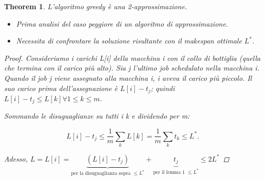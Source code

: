 \documentclass{article}
\newtheorem{theorem}{Theorem}[subsection]
\begin{document}
\begin{theorem}
    L'algoritmo greedy è una 2-approssimazione.
    \begin{itemize}
        \item Prima analisi del caso peggiore di un algoritmo di approssimazione.
        \item Necessita di confrontare la soluzione risultante con il makespan ottimale $L^*$.
    \end{itemize}
    \begin{proof}
    Consideriamo i carichi L[i] della macchina i con il collo di bottiglia (quella che termina con il carico più alto). Sia j l'ultimo job schedulato nella macchina i. Quando il job j viene assegnato alla macchina i, i aveva il carico più piccolo.
    Il suo carico prima dell'assegnazione è $L[i]-t_j$; quindi $L[i]-t_j\leq L[k] \forall 1\leq k \leq m$. 

    \noindent Sommando le disuguaglianze su tutti i k e dividendo per m:
    \begin{center}
        $$
        L[i]-t_j \leq \frac{1}{m}\sum_kL[k] = \frac{1}{m}\sum_kt_k \leq L^*.    
        $$
    \end{center}  
    Adesso, $L = L[i] = \underbrace{(L[i]-t_j)}_\text{per la disuguaglianza sopra $\leq L^*$}+\underbrace{t_j}_\text{per il lemma 1 $\leq L^*$} \leq 2L^*$
    \end{proof}
\end{theorem}
\end{document}
